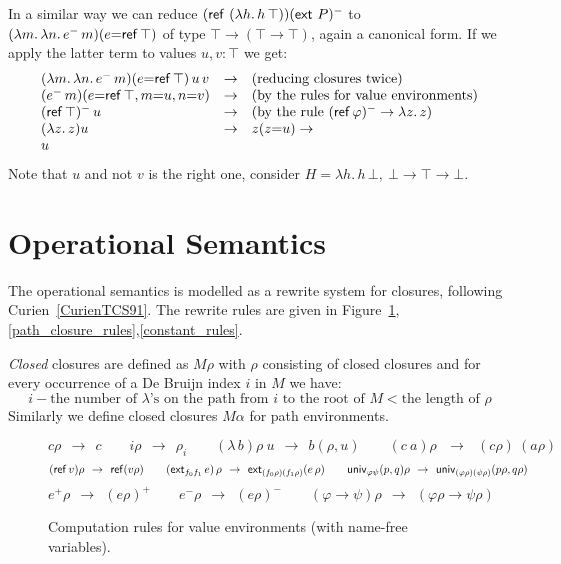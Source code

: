 \documentclass[10pt,a4paper]{article}
\newcommand{\lam}[2]{\lambda{#1.\,#2}}
\newcommand{\red}{~~{\to}~~}
\newcommand{\unphsi}{{\univ_{\varphi\psi}}}
\newcommand{\extfs}{{\ext_{f_0 f_1}}}
\newcommand{\Ref}{{\sf ref}}
\newcommand{\ext}{{\sf ext}}
\newcommand{\univ}{{\sf univ}}
\begin{document}
In a similar way we can reduce $(\Ref~(\lam{h}{h\,\top}))(\ext~P)^-$ to
$(\lambda m.\,\lambda n.\,{e^-\,m})(e{=}\Ref\,\top)$ of type $\top\to (\top\to \top)$,
again a canonical form. If we apply the latter term to values $u,v: \top$ we get:
\[
\begin{array}{lcl}
(\lambda m.\,\lambda n.\,{e^-\,m})(e{=}\Ref\,\top)\,u\,v &\to
&(\mbox{reducing closures twice})\\
(e^-\,m)(e{=}\Ref\,\top,m{=}u,n{=}v)                   &\to
&(\mbox{by the rules for value environments})\\
(\Ref\,\top)^-\,u                                        &\to
&(\mbox{by the rule $(\Ref\,\varphi)^- \to \lambda z.\,z$})\\
(\lambda z.\,z) u          &\to&
z(z{=}u) \to\\ u
\end{array}
\]
Note that $u$ and not $v$ is the right one, consider $H=\lambda h.\,h\,\bot,~\bot\to\top\to\bot$.

\section{Operational Semantics}

The operational semantics is modelled as a rewrite system for closures,
following Curien~\ref{CurienTCS91}. The rewrite rules are given in
Figure~\ref{value_closure_rules},\ref{path_closure_rules},\ref{constant_rules}.

\medskip

\emph{Closed} closures are defined as $M\rho$ with $\rho$ 
consisting of closed closures and for every occurrence of a De Bruijn index $i$
in $M$ we have:
\[
i - \text{the number of $\lambda$'s on the path from $i$ to the root of $M$} < 
\text{the length of $\rho$}
\]
Similarly we define closed closures $M\alpha$ for path environments.

\begin{figure}[h]
\[
c\rho \red c\quad\quad
i\rho \red \rho_i\quad\quad
(\lambda\,b)\rho~u \red b(\rho,u)\quad\quad
(c~a)\rho ~\red~ (c\rho)~(a\rho)
\]
\[
(\Ref\,v)\rho \red \Ref (v\rho)\quad\quad
(\extfs\,e)\,\rho \red \ext_{(f_0\rho)(f_1\rho)} (e\,\rho)\quad\quad
\unphsi(p,q)\rho \red \univ_{(\varphi\rho)(\psi\rho)}(p\rho,q\rho)\quad\quad
\]
\[
e^+\rho \red (e\rho)^+\quad\quad
e^-\rho \red (e\rho)^-\quad\quad
(\varphi\to\psi)\rho \red (\varphi\rho\to\psi\rho)
\]

\caption{Computation rules for value environments (with name-free variables).
\label{value_closure_rules}}
\end{figure}
\end{document}
